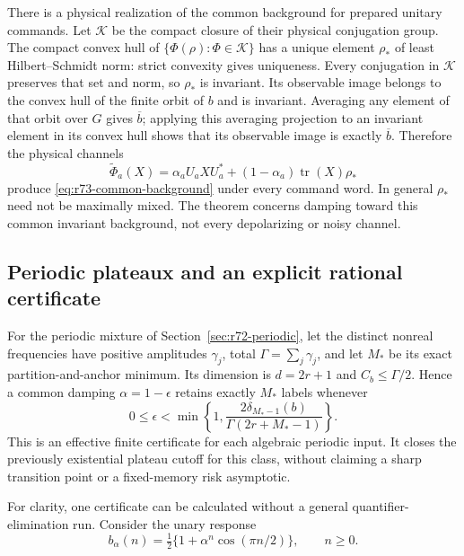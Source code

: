 There is a physical realization of the common background for prepared unitary
commands. Let $\mathcal K$ be the compact closure of their physical conjugation
group. The compact convex hull of $\{\Phi(\rho):\Phi\in\mathcal K\}$ has a
unique element $\rho_*$ of least Hilbert--Schmidt norm: strict convexity gives
uniqueness. Every conjugation in $\mathcal K$ preserves that set and norm, so
$\rho_*$ is invariant. Its observable image belongs to the convex hull of the
finite orbit of $b$ and is invariant. Averaging any element of that orbit
over $G$ gives $\overline b$; applying this averaging projection to an
invariant element in its convex hull shows that its observable image is
exactly $\overline b$. Therefore the physical channels
\[
 \widetilde\Phi_a(X)=\alpha_aU_aXU_a^*
                   +(1-\alpha_a)\operatorname{tr}(X)\rho_*
\]
produce \eqref{eq:r73-common-background} under every command word. In general
$\rho_*$ need not be maximally mixed. The theorem concerns damping toward
this common invariant background, not every depolarizing or noisy channel.

\subsection{Periodic plateaux and an explicit rational certificate}
For the periodic mixture of Section~\ref{sec:r72-periodic}, let the distinct
nonreal frequencies have positive amplitudes $\gamma_j$, total
$\Gamma=\sum_j\gamma_j$, and let $M_*$ be its exact partition-and-anchor
minimum. Its dimension is $d=2r+1$ and $C_b\le\Gamma/2$. Hence a common
damping $\alpha=1-\epsilon$ retains exactly $M_*$ labels whenever
\begin{equation}\label{eq:r73-periodic-cutoff}
 0\le\epsilon<
 \min\left\{1,\frac{2\delta_{M_*-1}(b)}{\Gamma(2r+M_*-1)}\right\}.
\end{equation}
This is an effective finite certificate for each algebraic periodic input.
It closes the previously existential plateau cutoff for this class, without
claiming a sharp transition point or a fixed-memory risk asymptotic.

For clarity, one certificate can be calculated without a general
quantifier-elimination run. Consider the unary response
\begin{equation}\label{eq:r73-period-four}
 b_\alpha(n)=\tfrac12\{1+\alpha^n\cos(\pi n/2)\},\qquad n\ge0.
\end{equation}

